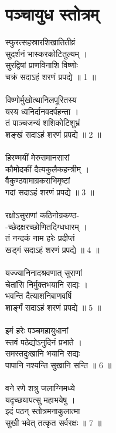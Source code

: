 \section{पञ्चायुध स्तोत्रम्}
स्फुरत्सहस्रारशिखातितीव्रं\\
सुदर्शनं भास्करकोटितुल्यम् ।\\
सुरद्विषां प्राणविनाशि विष्णोः\\
चक्रं सदाऽहं शरणं प्रपद्ये ॥ 1 ॥\\
\\
विष्णोर्मुखोत्थानिलपूरितस्य\\
यस्य ध्वनिर्दानवदर्पहन्ता ।\\
तं पाञ्चजन्यं शशिकोटिशुभ्रं\\
शङ्खं सदाऽहं शरणं प्रपद्ये ॥ 2 ॥\\
\\
हिरण्मयीं मेरुसमानसारां\\
कौमोदकीं दैत्यकुलैकहन्त्रीम् ।\\
वैकुण्ठवामाग्रकराभिमृष्टां\\
गदां सदाऽहं शरणं प्रपद्ये ॥ 3 ॥\\
\\
रक्षोऽसुराणां कठिनोग्रकण्ठ-\\
-च्छेदक्षरच्छोणितदिग्धधारम् ।\\
तं नन्दकं नाम हरेः प्रदीप्तं\\
खड्गं सदाऽहं शरणं प्रपद्ये ॥ 4 ॥\\
\\
यज्ज्यानिनादश्रवणात् सुराणां\\
चेतांसि निर्मुक्तभयानि सद्यः ।\\
भवन्ति दैत्याशनिबाणवर्षि\\
शार्ङ्गं सदाऽहं शरणं प्रपद्ये ॥ 5 ॥\\
\\
इमं हरेः पञ्चमहायुधानां\\
स्तवं पठेद्योऽनुदिनं प्रभाते ।\\
समस्तदुःखानि भयानि सद्यः\\
पापानि नश्यन्ति सुखानि सन्ति ॥ 6 ॥\\
\\
वने रणे शत्रु जलाग्निमध्ये\\
यदृच्छयापत्सु महाभयेषु ।\\
इदं पठन् स्तोत्रमनाकुलात्मा\\
सुखी भवेत् तत्कृत सर्वरक्षः ॥ 7 ॥\\
\\
[* अधिक श्लोकाः –\\
यच्चक्रशङ्खं गदखड्गशार्ङ्गिणं\\
पीताम्बरं कौस्तुभवत्सलाञ्छितम् ।\\
श्रियासमेतोज्ज्वलशोभिताङ्गं\\
विष्णुं सदाऽहं शरणं प्रपद्ये ॥\\
\\
जले रक्षतु वाराहः स्थले रक्षतु वामनः ।\\
अटव्यां नारसिंहश्क्ष्च सर्वतः पातु केशवः ॥ *]\\
